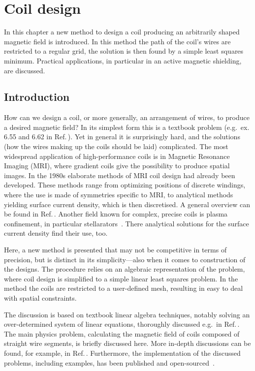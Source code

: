 \chapter{Coil design}
\label{ch:coil_design}

In this chapter a new method to design a coil producing an arbitrarily shaped magnetic field is introduced. In this method the path of the coil's wires are restricted to a regular grid, the solution is then found by a simple least squares minimum. Practical applications, in particular in an active magnetic shielding, are discussed.




\section{Introduction}
How can we design a coil, or more generally, an arrangement of wires, to produce a desired magnetic field? In its simplest form this is a textbook problem (e.g.\ ex. 6.55 and 6.62 in Ref.\,\cite{Purcell}).
Yet in general it is surprisingly hard, and the solutions (how the wires making up the coils should be laid) complicated.
The most widespread application of high-performance coils is in Magnetic Resonance Imaging (MRI), where gradient coils give the possibility to produce spatial images.
In the 1980s elaborate methods of MRI coil design had already been developed.
These methods range from optimizing positions of discrete windings, where the use is made of symmetries specific to MRI, to analytical methods yielding surface current density, which is then discretised.
A general overview can be found in Ref.\,\cite{Turner1993}.
Another field known for complex, precise coils is plasma confinement, in particular stellarators~\cite{Beidler1990}. There analytical solutions for the surface current density find their use, too.

Here, a new method is presented that may not be competitive in terms of precision, but is distinct in its simplicity---also when it comes to construction of the designs. The procedure relies on an algebraic representation of the problem, where coil design is simplified to a simple linear least squares problem.
In the method the coils are restricted to a user-defined mesh, resulting in easy to deal with spatial constraints.

The discussion is based on textbook linear algebra techniques, notably solving an over-determined system of linear equations, thoroughly discussed e.g.\ in Ref.\,\cite{Anton}.
The main physics problem, calculating the magnetic field of coils composed of straight wire segments, is briefly discussed here.
More in-depth discussions can be found, for example, in Ref.\,\cite{Griffith}.
Furthermore, the implementation of the discussed problems, including examples, has been published and open-sourced~\cite{Coilsjlcode}.

